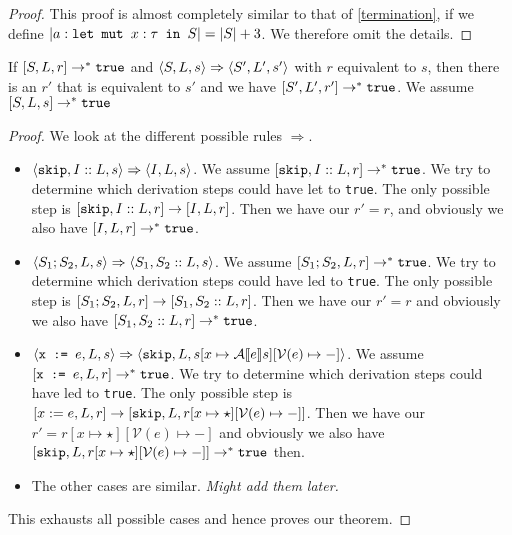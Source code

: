 \begin{proof}
This proof is almost completely similar to that of \ref{termination}, if we define $|a : \texttt{let mut }x : \tau \texttt{ in } S| = |S| + 3$. We therefore omit the details.
\end{proof}


\begin{theorem}
\label{preservationb}
If $[ S, L, r ] \to ^* \texttt{true}$ and $\langle S, L, s \rangle \Rightarrow \langle S', L', s' \rangle$ with $r$ equivalent to $s$, then there is an $r'$ that is equivalent to $s'$ and we have $[ S', L', r' ] \to ^* \texttt{true}$. We assume $[ S, L, s ] \to ^* \texttt{true}$
\end{theorem}

\begin{proof}
We look at the different possible rules $\Rightarrow$. 
\begin{itemize}
    \item $\langle \texttt{skip}, I::L, s \rangle \Rightarrow \langle I, L, s \rangle$. We assume $[ \texttt{skip}, I::L, r ] \to ^* \texttt{true}$. We try to determine which derivation steps could have let to \texttt{true}. The only possible step is $[ \texttt{skip}, I::L, r ]\to [ I, L, r ]$. Then we have our $r' = r$, and obviously we also have $[ I, L, r ] \to^* \texttt{true}$.
    \item $\langle S_1; S_2, L, s \rangle \Rightarrow \langle S_1, S_2::L, s \rangle$. We assume $[ S_1; S_2, L, r ] \to ^* \texttt{true}$. We try to determine which derivation steps could have led to \texttt{true}. The only possible step is $[ S_1; S_2, L, r ] \to [ S_1, S_2::L, r ]$. Then we have our $r' = r$ and obviously we also have $[ S_1, S_2::L, r ] \to^* \texttt{true}$.
    \item $\langle \texttt{x := } e, L, s \rangle \Rightarrow \langle \texttt{skip}, L, s[x \mapsto \mathcal{A} \llbracket e \rrbracket s][\mathcal{V}(e)\mapsto-] \rangle$. We assume $[ \texttt{x := } e, L, r ] \to ^* \texttt{true}$. We try to determine which derivation steps could have led to \texttt{true}. The only possible step is $[ x:=e, L, r ] \to [ \texttt{skip}, L, r[x\mapsto \star][\mathcal{V}(e) \mapsto -] ]$. Then we have our $r' = r[x\mapsto \star][\mathcal{V}(e) \mapsto -]$ and obviously we also have $[ \texttt{skip}, L, r[x\mapsto \star][\mathcal{V}(e) \mapsto -] ] \to^* \texttt{true}$ then.
    \item The other cases are similar. \emph{Might add them later.}
\end{itemize}
This exhausts all possible cases and hence proves our theorem.
\end{proof}


